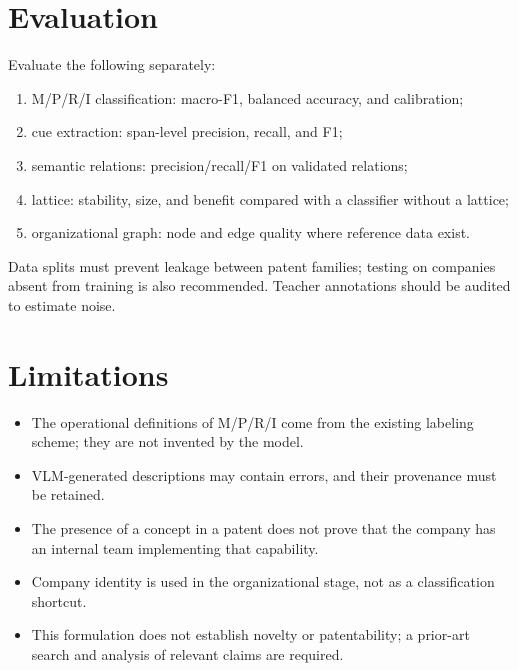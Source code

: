 \documentclass[11pt,a4paper]{article}
\begin{document}
\section{Evaluation}
Evaluate the following separately:
\begin{enumerate}
\item M/P/R/I classification: macro-F1, balanced accuracy, and calibration;
\item cue extraction: span-level precision, recall, and F1;
\item semantic relations: precision/recall/F1 on validated relations;
\item lattice: stability, size, and benefit compared with a classifier without a lattice;
\item organizational graph: node and edge quality where reference data exist.
\end{enumerate}
Data splits must prevent leakage between patent families; testing on companies absent from training is also recommended. Teacher annotations should be audited to estimate noise.

\section{Limitations}
\begin{itemize}
\item The operational definitions of M/P/R/I come from the existing labeling scheme; they are not invented by the model.
\item VLM-generated descriptions may contain errors, and their provenance must be retained.
\item The presence of a concept in a patent does not prove that the company has an internal team implementing that capability.
\item Company identity is used in the organizational stage, not as a classification shortcut.
\item This formulation does not establish novelty or patentability; a prior-art search and analysis of relevant claims are required.
\end{itemize}
\end{document}
